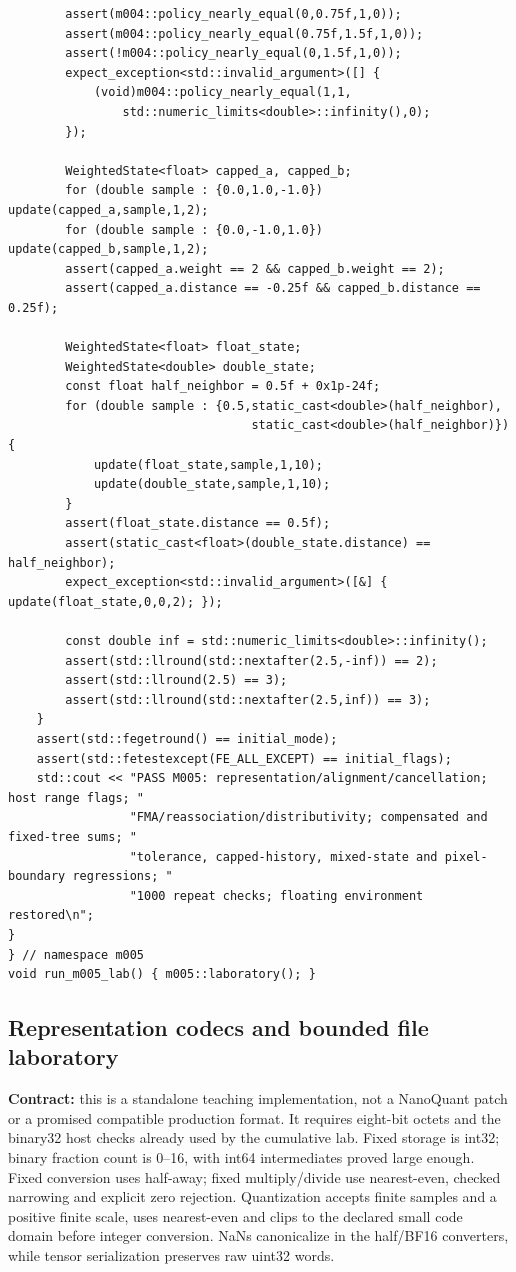 \begin{verbatim}
        assert(m004::policy_nearly_equal(0,0.75f,1,0));
        assert(m004::policy_nearly_equal(0.75f,1.5f,1,0));
        assert(!m004::policy_nearly_equal(0,1.5f,1,0));
        expect_exception<std::invalid_argument>([] {
            (void)m004::policy_nearly_equal(1,1,
                std::numeric_limits<double>::infinity(),0);
        });

        WeightedState<float> capped_a, capped_b;
        for (double sample : {0.0,1.0,-1.0}) update(capped_a,sample,1,2);
        for (double sample : {0.0,-1.0,1.0}) update(capped_b,sample,1,2);
        assert(capped_a.weight == 2 && capped_b.weight == 2);
        assert(capped_a.distance == -0.25f && capped_b.distance == 0.25f);

        WeightedState<float> float_state;
        WeightedState<double> double_state;
        const float half_neighbor = 0.5f + 0x1p-24f;
        for (double sample : {0.5,static_cast<double>(half_neighbor),
                                  static_cast<double>(half_neighbor)}) {
            update(float_state,sample,1,10);
            update(double_state,sample,1,10);
        }
        assert(float_state.distance == 0.5f);
        assert(static_cast<float>(double_state.distance) == half_neighbor);
        expect_exception<std::invalid_argument>([&] { update(float_state,0,0,2); });

        const double inf = std::numeric_limits<double>::infinity();
        assert(std::llround(std::nextafter(2.5,-inf)) == 2);
        assert(std::llround(2.5) == 3);
        assert(std::llround(std::nextafter(2.5,inf)) == 3);
    }
    assert(std::fegetround() == initial_mode);
    assert(std::fetestexcept(FE_ALL_EXCEPT) == initial_flags);
    std::cout << "PASS M005: representation/alignment/cancellation; host range flags; "
                 "FMA/reassociation/distributivity; compensated and fixed-tree sums; "
                 "tolerance, capped-history, mixed-state and pixel-boundary regressions; "
                 "1000 repeat checks; floating environment restored\n";
}
} // namespace m005
void run_m005_lab() { m005::laboratory(); }
\end{verbatim}

\subsection{Representation codecs and bounded file laboratory}\label{appendix-4e2236f53445-representation-codecs-and-bounded-file-laboratory}

\textbf{Contract:} this is a standalone teaching implementation, not a NanoQuant patch or a promised compatible production format. It requires eight-bit octets and the binary32 host checks already used by the cumulative lab. Fixed storage is int32; binary fraction count is 0--16, with int64 intermediates proved large enough. Fixed conversion uses half-away; fixed multiply/divide use nearest-even, checked narrowing and explicit zero rejection. Quantization accepts finite samples and a positive finite scale, uses nearest-even and clips to the declared small code domain before integer conversion. NaNs canonicalize in the half/BF16 converters, while tensor serialization preserves raw uint32 words.

